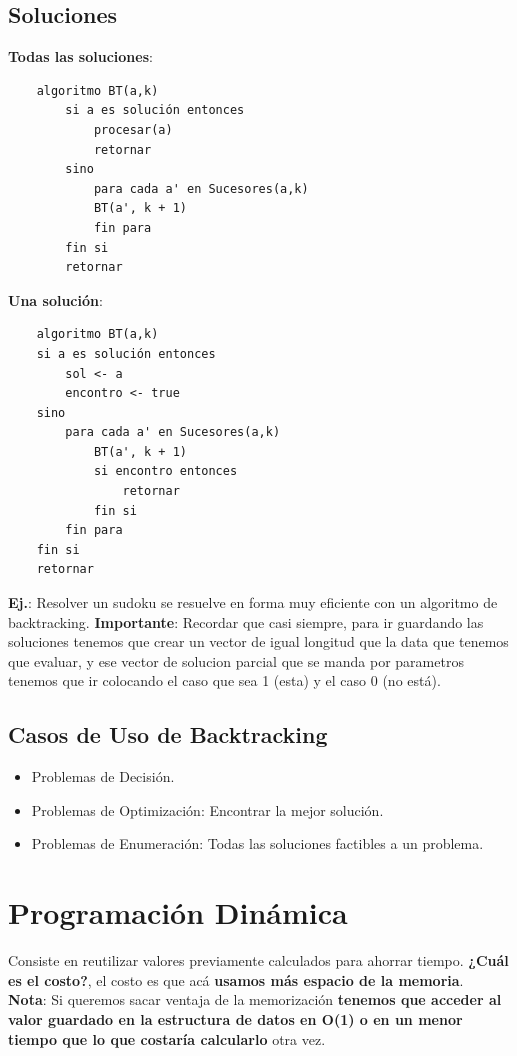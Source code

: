 \documentclass[10pt,a4paper]{article}
\begin{document}
\subsection*{Soluciones}
\textbf{Todas las soluciones}:
\begin{lstlisting}
    algoritmo BT(a,k)
        si a es solución entonces
            procesar(a)
            retornar
        sino
            para cada a' en Sucesores(a,k)
            BT(a', k + 1)
            fin para
        fin si
        retornar
\end{lstlisting}
\textbf{Una solución}:
\begin{lstlisting}
    algoritmo BT(a,k)
    si a es solución entonces
        sol <- a
        encontro <- true
    sino
        para cada a' en Sucesores(a,k)
            BT(a', k + 1)
            si encontro entonces
                retornar
            fin si
        fin para
    fin si
    retornar
\end{lstlisting}
\textbf{Ej.}: Resolver un sudoku se resuelve en forma muy eficiente con un algoritmo de backtracking.
\textbf{Importante}: Recordar que casi siempre, para ir guardando las soluciones tenemos que crear un vector de igual longitud que la data que tenemos que evaluar, y ese vector de solucion parcial que se manda por parametros tenemos que ir colocando el caso que sea 1 (esta) y el caso 0 (no está).
\subsection*{Casos de Uso de Backtracking}
\begin{itemize}
    \item Problemas de Decisión.
    \item Problemas de Optimización: Encontrar la mejor solución.
    \item Problemas de Enumeración: Todas las soluciones factibles a un problema.
\end{itemize}
\section*{Programación Dinámica}
Consiste en reutilizar valores previamente calculados para ahorrar tiempo. \textbf{¿Cuál es el costo?}, el costo es que acá \textbf{usamos más espacio de la memoria}. \\

\textbf{Nota}: Si queremos sacar ventaja de la memorización \textbf{tenemos que acceder al valor guardado en la estructura de datos en O(1) o en un menor tiempo que lo que costaría calcularlo} otra vez. \\
\end{document}
